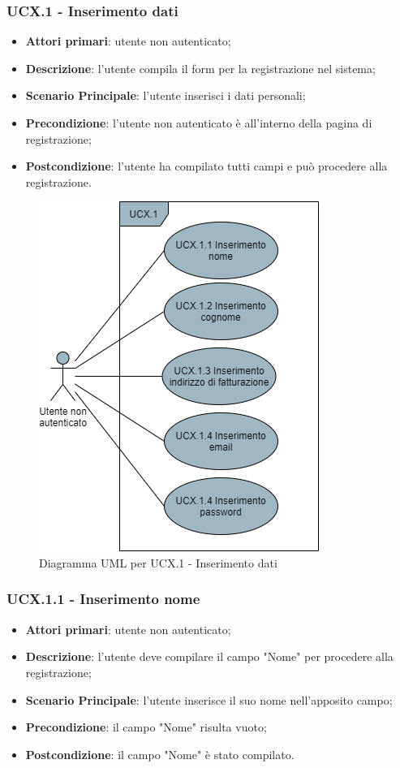 \subsubsection{UCX.1 - Inserimento dati}
\begin{itemize}
\item \textbf{Attori primari}: utente non autenticato;
\item \textbf{Descrizione}: l'utente compila il form per la registrazione nel sistema;
\item \textbf{Scenario Principale}: l'utente inserisci i dati personali;
\item \textbf{Precondizione}: l'utente non autenticato è all'interno della pagina di registrazione;
\item \textbf{Postcondizione}: l'utente ha compilato tutti campi e può procedere alla registrazione.
\end{itemize}

\begin{figure}[H]
\centering
\includegraphics[scale=0.6]{res/UseCase/Immagini/InserimentoDatiRegistrazione}
\caption{Diagramma UML per UCX.1 - Inserimento dati}
\end{figure}


\subsubsection{UCX.1.1 - Inserimento nome}
\begin{itemize}
\item \textbf{Attori primari}: utente non autenticato;
\item \textbf{Descrizione}: l'utente deve compilare il campo "Nome" per procedere alla registrazione;
\item \textbf{Scenario Principale}: l'utente inserisce il suo nome nell'apposito campo;
\item \textbf{Precondizione}: il campo "Nome" risulta vuoto;
\item \textbf{Postcondizione}: il campo "Nome" è stato compilato.
\end{itemize}

